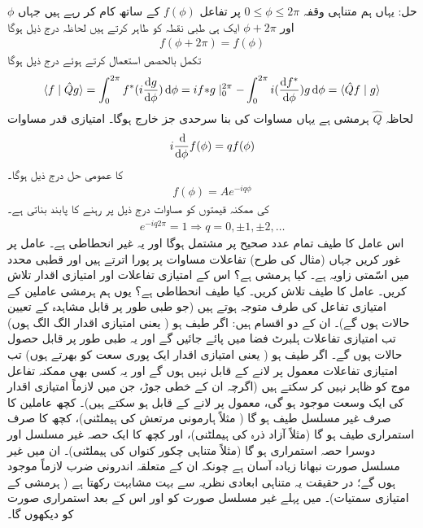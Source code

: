 حل: یہاں ہم متناہی وقفہ \(0\leq\phi\leq 2\pi\) پر تفاعل \(f(\phi)\) کے ساتھ کام کر رہے ہیں جہاں \(\phi\) اور \(\phi+2\pi\) ایک ہی طبی نقطہ کو طاہر کرتے ہیں لحاظہ درج ذیل ہوگا 
\begin{align}\label{مساوات_قواعد_دہراتا_تفاعل}
	f(\phi + 2\pi) = f(\phi)
\end{align}
تکمل بالحصص استعمال کرتے ہوئے درج ذیل ہوگا 
\begin{align*}
	\langle f\mid\hat{Q}g \rangle = \int_{0}^{2\pi}f^{*}(i\frac{\dif g}{\dif \phi})\dif \phi = if{*}g\mid^{2\pi}_{0} - \int_{0}^{2\pi}i(\frac{\dif f^*}{\dif \phi})g\dif \phi = \langle \hat{Q}f\mid g \rangle
\end{align*}
لحاظہ \(\hat{Q}\) ہرمشی ہے یہاں مساوات  کی بنا سرحدی جز خارج ہوگا۔ امتیازی قدر مساوات 
\begin{align}
	i\frac{\dif}{\dif \phi}f(\phi) = qf(\phi)
\end{align}
کا عمومی حل درج ذیل ہوگا۔
\begin{align}
	f(\phi) = Ae^{-iq\phi}
\end{align}
  کی ممکنہ قیمتوں کو مساوات  درج ذیل پر رہنے کا پابند بناتی ہے۔
\begin{align}
	e^{-iq2\pi} = 1 \Rightarrow q = 0, \pm1, \pm2, \dots
\end{align}
اس عامل کا طیف تمام عدد صحیح پر مشتمل ہوگا اور یہ غیر انحطاطی ہے۔
عامل  پر غور کریں جہاں (مثال  کی طرح) تفاعلات مساوات  پر پورا اترتے ہیں اور  قطبی محدد میں اسّمتی زاویہ ہے۔ کیا  ہرمشی ہے؟ اس کے امتیازی تفاعلات اور امتیازی اقدار تلاش کریں۔ عامل  کا طیف تلاش کریں۔ کیا طیف انحطاطی ہے؟
یوں ہم ہرمشی عاملین کے امتیازی تفاعل کی طرف متوجہ ہوتے ہیں (جو طبی طور پر قابل مشاہدہ کے تعیین حالات ہوں گے)۔ ان کے دو اقسام ہیں: اگر طیف  ہو ( یعنی امتیازی اقدار الگ الگ ہوں) تب امتیازی تفاعلات ہلبرٹ فضا میں پائے جائیں گے اور یہ طبی طور پر قابل حصول حالات ہوں گے۔ اگر طیف  ہو ( یعنی امتیازی اقدار ایک پوری سعت کو بھرتے ہوں) تب امتیازی تفاعلات معمول پر لانے کے قابل نہیں ہوں گے اور یہ کسی بھی ممکنہ تفاعل موج کو ظاہر نہیں کر سکتے ہیں (اگرچہ ان کے خطی جوڑ، جن میں لازماً امتیازی اقدار کی ایک وسعت موجود ہو گی، معمول پر لانے کے قابل ہو سکتے ہیں)۔ کچھ عاملین کا صرف غیر مسلسل طیف ہو گا ( مثلاً ہارمونی مرتعش کی ہیملٹنی)، کچھ کا صرف استمراری طیف ہو گا (مثلاً آزاد ذرہ کی ہیملٹنی)، اور کچھ کا ایک حصہ غیر مسلسل اور دوسرا حصہ استمراری ہو گا (مثلاً متناہی چکور کنواں کی ہیملٹنی)۔ ان میں غیر مسلسل صورت نبھانا زیادہ آسان ہے چونکہ ان کے متعلقہ اندرونی ضرب لازماً موجود ہوں گے؛ در حقیقت یہ متناہی ابعادی نظریہ سے بہت مشابہت رکھتا ہے ( ہرمشی  کے امتیازی سمتیات)۔ میں پہلے غیر مسلسل صورت کو اور اس کے بعد استمراری صورت کو دیکھوں گا۔ 


